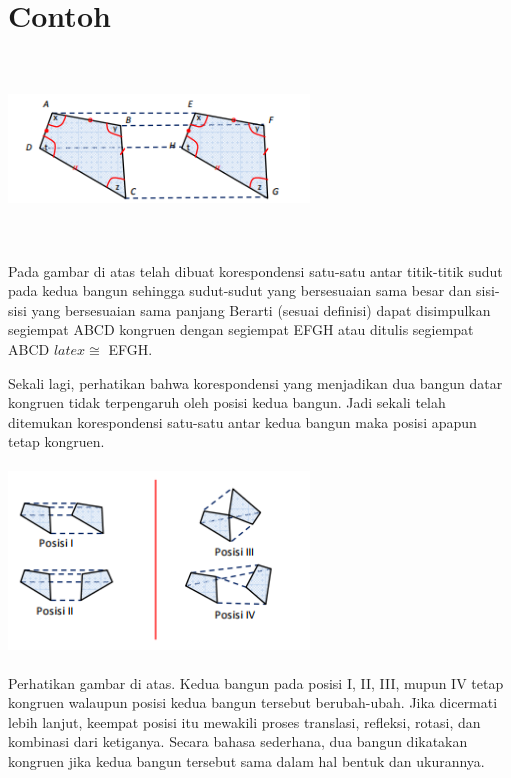 \documentclass[11pt,fleqn]{book} %
\begin{document}

\section{Contoh}
\includegraphics[width = 8cm, height= 5cm]{Pictures/1.png}
 
Pada gambar di atas telah dibuat korespondensi satu-satu antar titik-titik sudut pada kedua bangun sehingga sudut-sudut yang bersesuaian sama besar dan sisi-sisi yang bersesuaian sama panjang Berarti (sesuai definisi) dapat disimpulkan segiempat
ABCD kongruen dengan segiempat EFGH atau ditulis segiempat ABCD $latex\cong $ EFGH.

Sekali lagi, perhatikan bahwa korespondensi yang menjadikan dua bangun datar kongruen tidak terpengaruh oleh posisi kedua bangun. Jadi sekali telah ditemukan korespondensi satu-satu antar kedua bangun maka posisi apapun tetap kongruen. 

\includegraphics[width = 8cm, height= 5cm]{Pictures/2.png}

Perhatikan gambar di atas. Kedua bangun pada posisi I, II, III, mupun IV tetap
kongruen walaupun posisi kedua bangun tersebut berubah-ubah. Jika dicermati lebih
lanjut, keempat posisi itu mewakili proses translasi, refleksi, rotasi, dan kombinasi
dari ketiganya. Secara bahasa sederhana, dua bangun dikatakan kongruen jika kedua
bangun tersebut sama dalam hal bentuk dan ukurannya. 

\paragraph{}
\end{document}
